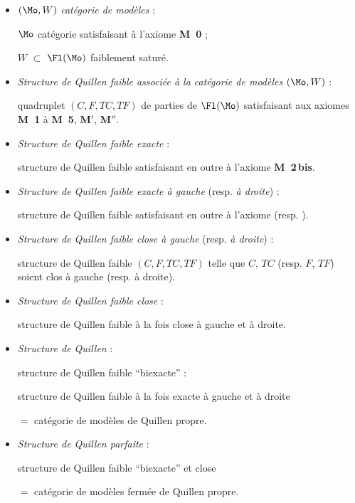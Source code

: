 \begin{itemize}
\item[\textbullet] $(\Mo,W)$ \textit{catégorie de modèles} :

$\Mo$ catégorie satisfaisant à l'axiome \textbf{M~0} ;

$W$ $\subset$ $\Fl(\Mo)$ faiblement saturé.

\item[\textbullet] \textit{Structure de Quillen faible associée à la catégorie de modèles} $(\Mo,W)$ :

quadruplet $(C,F,TC,TF)$ de parties de $\Fl(\Mo)$ satisfaisant aux axiomes \textbf{M~1} à \textbf{M~5}, $\mathbf{M}'$, $\mathbf{M}''$.

\item[\textbullet] \textit{Structure de Quillen faible exacte} :

structure de Quillen faible satisfaisant en outre à l'axiome \textbf{M~2\,bis}.

\item[\textbullet] \textit{Structure de Quillen faible exacte à gauche} (resp. \textit{à droite}) :

structure de Quillen faible satisfaisant en outre à l'axiome \Mzg{} (resp. \Mzd).
\end{itemize}


\begin{itemize}
\item[\textbullet] \textit{Structure de Quillen faible close à gauche} (resp. \textit{à droite}) :

structure de Quillen faible $(C,F,TC,TF)$ telle que $C$, $TC$ (resp. $F$, $TF$) soient clos à gauche (resp. à droite).

\item[\textbullet] \textit{Structure de Quillen faible close} :

structure de Quillen faible à la fois close à gauche et à droite.

\item[\textbullet] \textit{Structure de Quillen} :

structure de Quillen faible “biexacte” :

structure de Quillen faible à la fois exacte à gauche et à droite

$=$ catégorie de modèles de Quillen propre.

\item[\textbullet] \textit{Structure de Quillen parfaite} :

structure de Quillen faible “biexacte” et close

$=$ catégorie de modèles fermée de Quillen propre.
\end{itemize}

